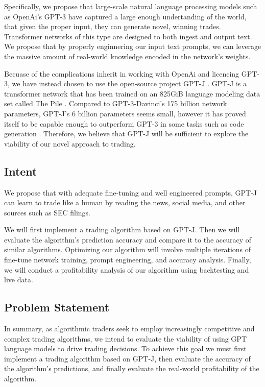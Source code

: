 \documentclass[conference]{IEEEtran}
\begin{document}
Specifically, we propose that large-scale natural language processing models such as OpenAi's GPT-3 \cite{Brown2020} have captured a large enough undertanding of the world, that given the proper input, they can generate novel, winning trades. Transformer networks of this type are designed to both ingest and output text. We propose that by properly enginnering our input text prompts, we can leverage the massive amount of real-world knowledge encoded in the network's weights.

Becuase of the complications inherit in working with OpenAi and licencing GPT-3, we have instead chosen to use the open-source project GPT-J \cite{mesh-transformer-jax}. GPT-J is a transformer network \cite{Vaswani2017} that has been trained on an 825GiB language modeling data set called The Pile \cite{Gao2021}. Compared to GPT-3-Davinci's 175 billion network parameters, GPT-J's 6 billion parameters seems small, however it has proved itself to be capable enough to outperform GPT-3 in some tasks such as code generation \cite{forefront}. Therefore, we believe that GPT-J will be sufficient to explore the viability of our novel approach to trading.

\subsection{Intent}
We propose that with adequate fine-tuning and well engineered prompts, GPT-J can learn to trade like a human by reading the news, social media, and other sources such as SEC filings.

We will first implement a trading algorithm based on GPT-J. Then we will evaluate the algorithm's prediction accuracy and compare it to the accuracy of similar algorithms. Optimizing our algorithm will involve multiple iterations of fine-tune network training, prompt engineering, and accuracy analysis. Finally, we will conduct a profitability analysis of our algorithm using backtesting and live data.

\subsection{Problem Statement}
In summary, as algorithmic traders seek to employ increasingly competitive and complex trading algorithms, we intend to evaluate the viability of using GPT language models to drive trading decisions. To achieve this goal we must first implement a trading algorithm based on GPT-J, then evaluate the accuracy of the algorithm's predictions, and finally evaluate the real-world profitability of the algorithm.
\end{document}
